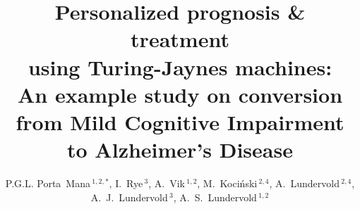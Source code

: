\documentclass[utf8]{FrontiersinHarvard} %
\newcommand*{\amp}{\&}
\renewcommand*{\|}[1][]{\nonscript\:#1\vert\nonscript\:\mathopen{}}
\newcommand*{\tjm}{Turing-Jaynes machine}
\def\firstAuthorLast{Porta~Mana {et~al.}} %
\def\Authors{P.G.L. Porta~Mana\,$^{1,2,*}$, I.~Rye\,$^{3}$, A.~Vik\,$^{1,2}$, M.~Koci\'nski\,$^{2,4}$, A.~Lundervold\,$^{2,4}$, A.~J.~Lundervold\,$^{3}$, A.~S.~Lundervold\,$^{1,2}$}
\begin{document}
\onecolumn
{}

\title[Personalized prognosis \amp\ treatment using a \tjm]{Personalized prognosis \& treatment\\ using Turing-Jaynes machines:\\ An example study on  conversion from Mild Cognitive Impairment to Alzheimer's Disease} 

\author[\firstAuthorLast ]{\Authors} %
\address{} %
\correspondance{} %

\extraAuth{}%


\maketitle
\end{document}
